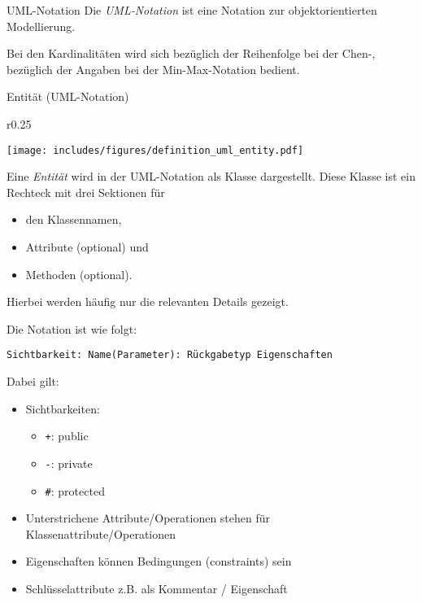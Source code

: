 \begin{defi}{UML-Notation}
    Die \emph{UML-Notation} ist eine Notation zur objektorientierten Modellierung.

    Bei den Kardinalitäten wird sich bezüglich der Reihenfolge bei der Chen-, bezüglich der Angaben bei der Min-Max-Notation bedient.
\end{defi}

\begin{defi}{Entität (UML-Notation)}
    \begin{wrapfigure}{r}{0.25\textwidth}
        \begin{center}
            \texttt{[image: includes/figures/definition\_uml\_entity.pdf]}
        \end{center}
    \end{wrapfigure}
    Eine \emph{Entität} wird in der UML-Notation als Klasse dargestellt.
    Diese Klasse ist ein Rechteck mit drei Sektionen für
    \begin{itemize}
        \item den Klassennamen,
        \item Attribute (optional) und
        \item Methoden (optional).
    \end{itemize}
    Hierbei werden häufig nur die relevanten Details gezeigt.

    Die Notation ist wie folgt:
    \begin{center}
        \texttt{Sichtbarkeit: Name(Parameter): Rückgabetyp {Eigenschaften}}
    \end{center}

    Dabei gilt:
    \begin{itemize}
        \item Sichtbarkeiten:
              \begin{itemize}
                  \item \texttt{+}: public
                  \item \texttt{-}: private
                  \item \texttt{\#}: protected
              \end{itemize}
        \item Unterstrichene Attribute/Operationen stehen für Klassenattribute/Operationen
        \item Eigenschaften können Bedingungen (constraints) sein
        \item Schlüsselattribute z.B. als Kommentar / Eigenschaft
    \end{itemize}
\end{defi}

